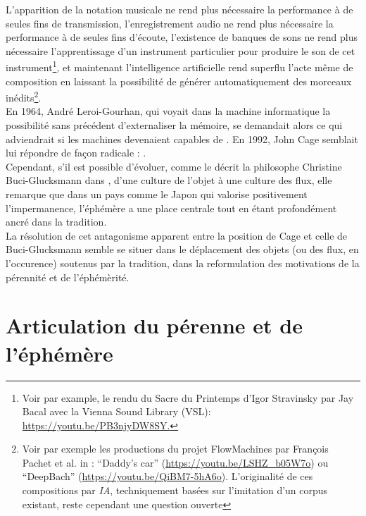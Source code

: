 \noindent L’apparition de la notation musicale ne rend plus nécessaire la performance à de seules fins de transmission, l’enregistrement audio ne rend plus nécessaire la performance à de seules fins d’écoute, l’existence de banques de sons ne rend plus nécessaire l’apprentissage d’un instrument particulier pour produire le son de cet instrument\footnote{Voir par example, le rendu du Sacre du Printemps d'Igor Stravinsky par Jay Bacal avec la Vienna Sound Library (VSL): \url{https://youtu.be/PB3njyDW8SY.}}, et maintenant l’intelligence artificielle rend superflu l'acte même de composition en laissant la possibilité de générer automatiquement des morceaux inédits\footnote{Voir par exemple les productions du projet FlowMachines par François Pachet et al. in \cite{hadjeres_deepbach:_2016}: “Daddy's car” (\url{https://youtu.be/LSHZ_b05W7o}) ou “DeepBach” (\url{https://youtu.be/QiBM7-5hA6o}). L'originalité de ces compositions par \textit{IA}, techniquement basées sur l'imitation d'un corpus existant, reste cependant une question ouverte}.\\
\indent En 1964, André Leroi-Gourhan, qui voyait dans la machine informatique la possibilité sans précédent d'externaliser la mémoire, se demandait alors ce qui adviendrait si les machines devenaient capables de \cite{leroi-gourhan_geste_1964}. En 1992, John Cage semblait lui répondre de façon radicale :  \cite{sebestik_ecoute_1992}. \\
\indent Cependant, s'il est possible d'évoluer, comme le décrit la philosophe Christine Buci-Glucksmann dans \cite{buci-glucksmann_esthetique_2003}, d'une culture de l'objet à une culture des flux, elle remarque que dans un pays comme le Japon qui valorise positivement l'impermanence, l'éphémère a une place centrale tout en étant profondément ancré dans la tradition.\\
\indent La résolution de cet antagonisme apparent entre la position de Cage et celle de Buci-Glucksmann semble se situer dans le déplacement des objets (ou des flux, en l'occurence) soutenus par la tradition, dans la reformulation des motivations de la pérennité et de l'éphémèrité.

\section{Articulation du pérenne et de l'éphémère}


